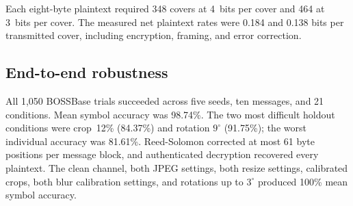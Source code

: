 \documentclass[10pt,journal]{IEEEtran}
\begin{document}
Each eight-byte plaintext required 348 covers at 4~bits per cover and
464 at 3~bits per cover. The measured net plaintext rates were 0.184
and 0.138 bits per transmitted cover, including encryption, framing,
and error correction.

\begin{table}[t]
\centering
\caption{Selected BOSSBase operating points on 8{,}000-image indices.}
\label{tab:config_boss}
\footnotesize
{}
\end{table}

\begin{table}[t]
\centering
\caption{Selected Caltech-101 operating points on 7{,}000-image RGB
  indices. All five partitions selected $K{=}16$.}
\label{tab:config_cal}
\footnotesize
{}
\end{table}

\subsection{End-to-end robustness}

All 1{,}050 BOSSBase trials succeeded across five seeds, ten messages,
and 21 conditions. Mean symbol accuracy was 98.74\%. The two most
difficult holdout conditions were crop~12\% (84.37\%) and rotation
$9^\circ$ (91.75\%); the worst individual accuracy was 81.61\%.
Reed-Solomon corrected at most 61 byte positions per message block,
and authenticated decryption recovered every plaintext. The clean
channel, both JPEG settings, both resize settings, calibrated crops,
both blur calibration settings, and rotations up to $3^\circ$ produced
100\% mean symbol accuracy.
\end{document}
